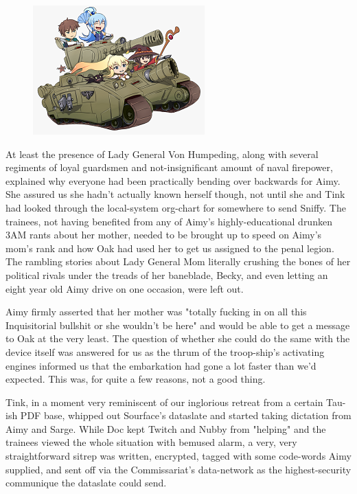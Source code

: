 \begin{figure}
	\begin{center}
		\includegraphics[width=\figwidth]{pics/21/121.png}
	\end{center}
\end{figure}
At least the presence of Lady General Von Humpeding, along with several regiments of loyal guardsmen and not-insignificant amount of naval firepower, explained why everyone had been practically bending over backwards for Aimy. 
She assured us she hadn't actually known herself though, not until she and Tink had looked through the local-system org-chart for somewhere to send Sniffy. 
The trainees, not having benefited from any of Aimy's highly-educational drunken 3AM rants about her mother, needed to be brought up to speed on Aimy's mom's rank and how Oak had used her to get us assigned to the penal legion. 
The rambling stories about Lady General Mom literally crushing the bones of her political rivals under the treads of her baneblade, Becky, and even letting an eight year old Aimy drive on one occasion, were left out.

Aimy firmly asserted that her mother was "totally fucking in on all this Inquisitorial bullshit or she wouldn't be here" and would be able to get a message to Oak at the very least. 
The question of whether she could do the same with the device itself was answered for us as the thrum of the troop-ship's activating engines informed us that the embarkation had gone a lot faster than we'd expected. 
This was, for quite a few reasons, not a good thing.

Tink, in a moment very reminiscent of our inglorious retreat from a certain Tau-ish PDF base, whipped out Sourface's dataslate and started taking dictation from Aimy and Sarge. 
While Doc kept Twitch and Nubby from "helping" and the trainees viewed the whole situation with bemused alarm, a very, very straightforward sitrep was written, encrypted, tagged with some code-words Aimy supplied, and sent off via the Commissariat's data-network as the highest-security communique the dataslate could send. 


